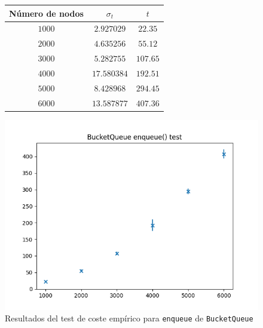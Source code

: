 \documentclass[a4paper, 12pt]{article}
\begin{document}
                \begin{figure}[ht!]
                    \centering
                    \begin{tabular}{|c|c|c|}
                        \hline
                        \textbf{Número de nodos} & \textbf{$\sigma_t$}  & \textbf{$t$} \\\hline
                        $1000$                   & $2.927029$           & $22.35$        \\\hline
                        $2000$                   & $4.635256$           & $55.12$        \\\hline
                        $3000$                   & $5.282755$           & $107.65$       \\\hline
                        $4000$                   & $17.580384$           & $192.51$       \\\hline
                        $5000$                   & $8.428968$           & $294.45$        \\\hline
                        $6000$                   & $13.587877$          & $407.36$       \\\hline                  
                    \end{tabular}
                    \includegraphics[]{img/costemp_bq_enq.png}
                    \caption{Resultados del test de coste empírico para 
                    \texttt{enqueue} de \texttt{BucketQueue}}
                    \label{f:enq_bq_test}
                \end{figure}
\end{document}
